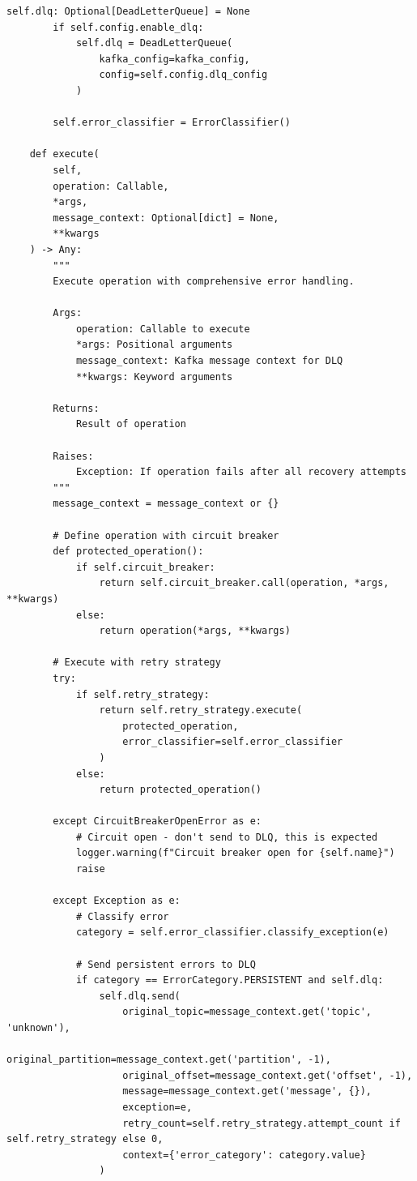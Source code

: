 \begin{lstlisting}[style=python, caption={Comprehensive Error Handler}]
        self.dlq: Optional[DeadLetterQueue] = None
        if self.config.enable_dlq:
            self.dlq = DeadLetterQueue(
                kafka_config=kafka_config,
                config=self.config.dlq_config
            )

        self.error_classifier = ErrorClassifier()

    def execute(
        self,
        operation: Callable,
        *args,
        message_context: Optional[dict] = None,
        **kwargs
    ) -> Any:
        """
        Execute operation with comprehensive error handling.

        Args:
            operation: Callable to execute
            *args: Positional arguments
            message_context: Kafka message context for DLQ
            **kwargs: Keyword arguments

        Returns:
            Result of operation

        Raises:
            Exception: If operation fails after all recovery attempts
        """
        message_context = message_context or {}

        # Define operation with circuit breaker
        def protected_operation():
            if self.circuit_breaker:
                return self.circuit_breaker.call(operation, *args, **kwargs)
            else:
                return operation(*args, **kwargs)

        # Execute with retry strategy
        try:
            if self.retry_strategy:
                return self.retry_strategy.execute(
                    protected_operation,
                    error_classifier=self.error_classifier
                )
            else:
                return protected_operation()

        except CircuitBreakerOpenError as e:
            # Circuit open - don't send to DLQ, this is expected
            logger.warning(f"Circuit breaker open for {self.name}")
            raise

        except Exception as e:
            # Classify error
            category = self.error_classifier.classify_exception(e)

            # Send persistent errors to DLQ
            if category == ErrorCategory.PERSISTENT and self.dlq:
                self.dlq.send(
                    original_topic=message_context.get('topic', 'unknown'),
                    original_partition=message_context.get('partition', -1),
                    original_offset=message_context.get('offset', -1),
                    message=message_context.get('message', {}),
                    exception=e,
                    retry_count=self.retry_strategy.attempt_count if self.retry_strategy else 0,
                    context={'error_category': category.value}
                )


\end{lstlisting}
